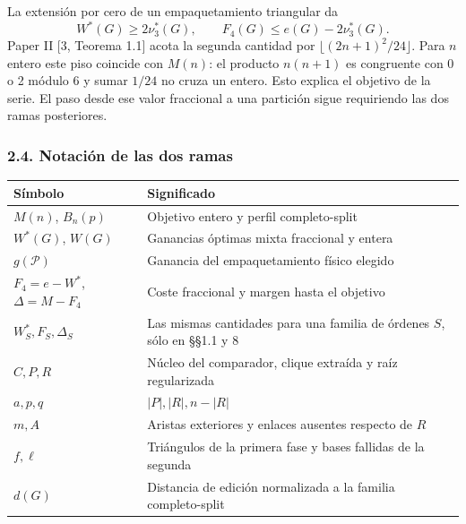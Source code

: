 \documentclass[spanish,11pt,a4paper]{article}
\newcounter{none}
\begin{document}
La extensión por cero de un empaquetamiento triangular da \[
W^*(G)\ge2\nu_3^*(G),\qquad
F_4(G)\le e(G)-2\nu_3^*(G).
\tag{2.5}
\] Paper II {[}3, Teorema 1.1{]} acota la segunda cantidad por \(\lfloor(2n+1)^2/24\rfloor\). Para \(n\) entero este piso coincide con \(M(n)\): el producto \(n(n+1)\) es congruente con 0 o 2 módulo 6 y sumar \(1/24\) no cruza un entero. Esto explica el objetivo de la serie. El paso desde ese valor fraccional a una partición sigue requiriendo las dos ramas posteriores.

\subsubsection{2.4. Notación de las dos ramas}\label{notaciuxf3n-de-las-dos-ramas}

{\def\LTcaptype{none} %
\begin{longtable}[c]{@{}
  >{\raggedright\arraybackslash}p{}
  >{\raggedright\arraybackslash}p{}@{}}
\toprule\noalign{}
\begin{minipage}[b]{\linewidth}\raggedright
Símbolo
\end{minipage} & \begin{minipage}[b]{\linewidth}\raggedright
Significado
\end{minipage} \\
\midrule\noalign{}
\endhead
\bottomrule\noalign{}
\endlastfoot
\(M(n)\), \(B_n(p)\) & Objetivo entero y perfil completo-split \\
\(W^*(G)\), \(W(G)\) & Ganancias óptimas mixta fraccional y entera \\
\(g(\mathcal P)\) & Ganancia del empaquetamiento físico elegido \\
\(F_4=e-W^*\), \(\Delta=M-F_4\) & Coste fraccional y margen hasta el objetivo \\
\(W_S^*,F_S,\Delta_S\) & Las mismas cantidades para una familia de órdenes \(S\), sólo en §§1.1 y 8 \\
\(C,P,R\) & Núcleo del comparador, clique extraída y raíz regularizada \\
\(a,p,q\) & \(|P|,|R|,n-|R|\) \\
\(m,A\) & Aristas exteriores y enlaces ausentes respecto de \(R\) \\
\(f,\ell\) & Triángulos de la primera fase y bases fallidas de la segunda \\
\(d(G)\) & Distancia de edición normalizada a la familia completo-split \\
\end{longtable}
}
\end{document}
